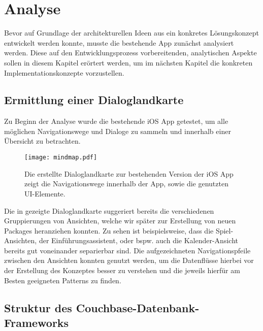 \chapter{Analyse}\label{ch:analyse}

Bevor auf Grundlage der architekturellen Ideen aus  ein konkretes Lösungskonzept entwickelt werden konnte, musste die bestehende App zunächst analysiert werden. Diese auf den Entwicklungsprozess vorbereitenden, analytischen Aspekte sollen in diesem Kapitel erörtert werden, um im nächsten Kapitel die konkreten Implementationskonzepte vorzustellen.

\section{Ermittlung einer Dialoglandkarte}

Zu Beginn der Analyse wurde die bestehende iOS App getestet, um alle möglichen Navigationswege und Dialoge zu sammeln und innerhalb einer Übersicht zu betrachten.

\begin{figure}[H]
\texttt{[image: mindmap.pdf]}
\caption{Die erstellte Dialoglandkarte zur bestehenden Version der iOS App zeigt die Navigationswege innerhalb der App, sowie die genutzten UI-Elemente.}\label{fig:swiftui}
\end{figure}

Die in  gezeigte Dialoglandkarte suggeriert bereits die verschiedenen Gruppierungen von Ansichten, welche wir später zur Erstellung von neuen Packages heranziehen konnten. Zu sehen ist beispielsweise, dass die Spiel-Ansichten, der Einführungsassistent, oder bspw. auch die Kalender-Ansicht bereits gut voneinander separierbar sind. Die aufgezeichneten Navigationspfeile zwischen den Ansichten konnten genutzt werden, um die Datenflüsse hierbei vor der Erstellung des Konzeptes besser zu verstehen und die jeweils hierfür am Besten geeigneten Patterns zu finden.

\section{Struktur des Couchbase-Datenbank-Frameworks}



